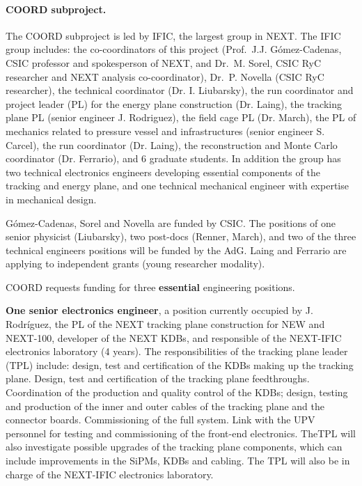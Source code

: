 \paragraph{COORD subproject.}

The COORD subproject is led by IFIC, the largest group in NEXT. The IFIC group includes: the co-coordinators of this project (Prof.~J.J. G\'omez-Cadenas, CSIC professor and spokesperson of NEXT, and Dr.~M. Sorel, CSIC RyC researcher and NEXT analysis co-coordinator), Dr.~P. Novella (CSIC RyC researcher), the technical coordinator (Dr. I. Liubarsky), the run coordinator and project leader (PL) for the energy plane construction (Dr. Laing), the tracking plane PL (senior engineer J. Rodriguez), the field cage PL (Dr. March), the PL of mechanics related to pressure vessel and infrastructures (senior engineer S. Carcel), the run coordinator (Dr. Laing), the reconstruction and Monte Carlo coordinator (Dr. Ferrario), and 6 graduate students. In addition the group has two technical electronics engineers developing essential components of the tracking and energy plane, and one technical mechanical engineer with expertise in mechanical design. 

G\'omez-Cadenas, Sorel and Novella are funded by CSIC. The positions of one senior physicist (Liubarsky), two post-docs (Renner, March), and two of the three technical engineers positions will be funded by the AdG. Laing and Ferrario are applying to independent grants (young researcher modality). 

COORD requests funding for three {\bf essential} engineering positions. 

{\bf One senior electronics engineer}, a position currently occupied by J. Rodríguez, the PL of the NEXT tracking plane construction for NEW and NEXT-100, developer of the NEXT KDBs, and responsible of the NEXT-IFIC electronics laboratory (4 years). The responsibilities of the tracking plane leader (TPL) include: design, test and certification of the KDBs making up the tracking plane. Design, test and certification of the tracking plane feedthroughs. Coordination of the production and quality control of the KDBs; design, testing and production of the inner and outer cables of the tracking plane and the connector boards. Commissioning of the full system. Link with the UPV personnel for testing and commissioning of the front-end electronics. TheTPL will also investigate possible upgrades of the tracking plane components, which can include improvements in the SiPMs, KDBs and cabling. The TPL will also be in charge of the NEXT-IFIC electronics laboratory. 

